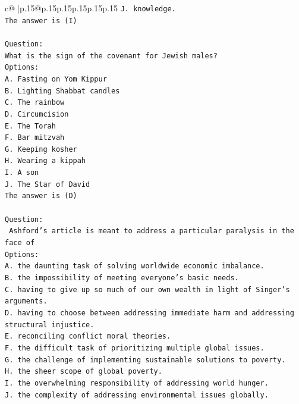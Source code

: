 \documentclass{article}
\begin{document}
{\begin{supertabular}{c@{$\;$}|p{.15\linewidth}@{}p{.15\linewidth}p{.15\linewidth}p{.15\linewidth}p{.15\linewidth}p{.15\linewidth}}
{{{\texttt{J. knowledge.} \\
\texttt{The answer is (I)} \\
\\ 
\texttt{Question:} \\
\texttt{What is the sign of the covenant for Jewish males?} \\
\texttt{Options:} \\
\texttt{A. Fasting on Yom Kippur} \\
\texttt{B. Lighting Shabbat candles} \\
\texttt{C. The rainbow} \\
\texttt{D. Circumcision} \\
\texttt{E. The Torah} \\
\texttt{F. Bar mitzvah} \\
\texttt{G. Keeping kosher} \\
\texttt{H. Wearing a kippah} \\
\texttt{I. A son} \\
\texttt{J. The Star of David} \\
\texttt{The answer is (D)} \\
\\ 
\texttt{Question:} \\
\texttt{ Ashford's article is meant to address a particular paralysis in the face of} \\
\texttt{Options:} \\
\texttt{A. the daunting task of solving worldwide economic imbalance.} \\
\texttt{B. the impossibility of meeting everyone's basic needs.} \\
\texttt{C. having to give up so much of our own wealth in light of Singer's arguments.} \\
\texttt{D. having to choose between addressing immediate harm and addressing structural injustice.} \\
\texttt{E. reconciling conflict moral theories.} \\
\texttt{F. the difficult task of prioritizing multiple global issues.} \\
\texttt{G. the challenge of implementing sustainable solutions to poverty.} \\
\texttt{H. the sheer scope of global poverty.} \\
\texttt{I. the overwhelming responsibility of addressing world hunger.} \\
\texttt{J. the complexity of addressing environmental issues globally.} \\
            }
        }
    }
     \\ \\


\end{supertabular}}
\end{document}
